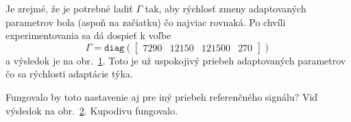 \documentclass[a4paper, 10pt, ]{article}
\begin{document}
\begin{figure}[!t]
	\centering

    \vspace{-3mm}


    \vspace{-2mm}

	\caption{}
	\label{figsc_ar06_kyvadlo_ep2_2}


    \vspace{-2mm}

\end{figure}






Je zrejmé, že je potrebné ladiť $\Gamma$ tak, aby rýchlosť zmeny adaptovaných parametrov bola (aspoň na začiatku) čo najviac rovnaká. Po chvíli experimentovania sa dá dospieť k voľbe
\begin{equation*}
    \Gamma = \texttt{diag}
    \left(
    \begin{bmatrix}
        7290 & 12150 & 121500 & 270
    \end{bmatrix}
    \right)
\end{equation*}
a výsledok je na obr.~\ref{figsc_ar06_kyvadlo_ep2_2}. Toto je už uspokojivý priebeh adaptovaných parametrov čo sa rýchlosti adaptácie týka.










Fungovalo by toto nastavenie aj pre iný priebeh referenčného signálu? Viď výsledok na obr.~\ref{figsc_ar06_kyvadlo_ep2_3}. Kupodivu fungovalo.






\begin{figure}[!t]
	\centering

    \vspace{-3mm}


    \vspace{-2mm}

	\caption{}
	\label{figsc_ar06_kyvadlo_ep2_3}


    \vspace{-2mm}

\end{figure}
\end{document}
